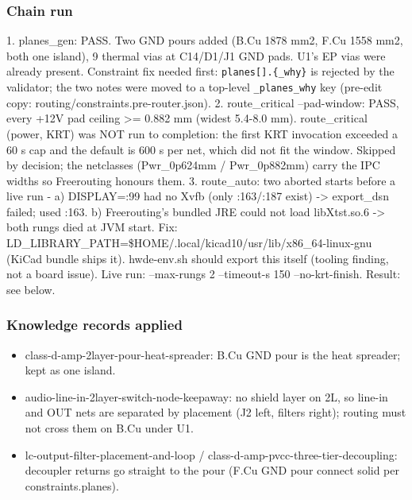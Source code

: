 \documentclass[11pt]{article}
\begin{document}
\subsubsection*{Chain run}
1. planes\_gen: PASS. Two GND pours added (B.Cu 1878 mm2, F.Cu 1558 mm2, both one island), 9 thermal vias at C14/D1/J1 GND pads. U1's EP vias were already present. Constraint fix needed first: \texttt{planes{[}{]}.\{\_why\}} is rejected by the validator; the two notes were moved to a top-level \texttt{\_planes\_why} key (pre-edit copy: routing/constraints.pre-router.json). 2. route\_critical --pad-window: PASS, every +12V pad ceiling \textgreater{}= 0.882 mm (widest 5.4-8.0 mm). route\_critical (power, KRT) was NOT run to completion: the first KRT invocation exceeded a 60 s cap and the default is 600 s per net, which did not fit the window. Skipped by decision; the netclasses (Pwr\_0p624mm / Pwr\_0p882mm) carry the IPC widths so Freerouting honours them. 3. route\_auto: two aborted starts before a live run - a) DISPLAY=:99 had no Xvfb (only :163/:187 exist) -\textgreater{} export\_dsn failed; used :163. b) Freerouting's bundled JRE could not load libXtst.so.6 -\textgreater{} both rungs died at JVM start. Fix: LD\_LIBRARY\_PATH=\$HOME/.local/kicad10/usr/lib/x86\_64-linux-gnu (KiCad bundle ships it). hwde-env.sh should export this itself (tooling finding, not a board issue). Live run: --max-rungs 2 --timeout-s 150 --no-krt-finish. Result: see below.

\subsubsection*{Knowledge records applied}
\begin{itemize}
\item class-d-amp-2layer-pour-heat-spreader: B.Cu GND pour is the heat spreader; kept as one island.
\item audio-line-in-2layer-switch-node-keepaway: no shield layer on 2L, so line-in and OUT nets are
separated by placement (J2 left, filters right); routing must not cross them on B.Cu under U1.
\item lc-output-filter-placement-and-loop / class-d-amp-pvcc-three-tier-decoupling: decoupler returns
go straight to the pour (F.Cu GND pour connect solid per constraints.planes).
\end{itemize}
\end{document}
